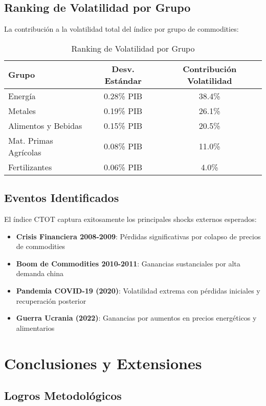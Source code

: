 \documentclass[12pt,a4paper]{article}
\begin{document}
\subsection{Ranking de Volatilidad por Grupo}

La contribución a la volatilidad total del índice por grupo de commodities:

\begin{table}[H]
\centering
\caption{Ranking de Volatilidad por Grupo}
\begin{tabular}{lcc}
\toprule
\textbf{Grupo} & \textbf{Desv. Estándar} & \textbf{Contribución Volatilidad} \\
\midrule
Energía & 0.28\% PIB & 38.4\% \\
Metales & 0.19\% PIB & 26.1\% \\
Alimentos y Bebidas & 0.15\% PIB & 20.5\% \\
Mat. Primas Agrícolas & 0.08\% PIB & 11.0\% \\
Fertilizantes & 0.06\% PIB & 4.0\% \\
\bottomrule
\end{tabular}
\label{tab:volatility_ranking}
\end{table}

\subsection{Eventos Identificados}

El índice CTOT captura exitosamente los principales shocks externos esperados:

\begin{itemize}
    \item \textbf{Crisis Financiera 2008-2009}: Pérdidas significativas por colapso de precios de commodities
    \item \textbf{Boom de Commodities 2010-2011}: Ganancias sustanciales por alta demanda china
    \item \textbf{Pandemia COVID-19 (2020)}: Volatilidad extrema con pérdidas iniciales y recuperación posterior
    \item \textbf{Guerra Ucrania (2022)}: Ganancias por aumentos en precios energéticos y alimentarios
\end{itemize}

\section{Conclusiones y Extensiones}

\subsection{Logros Metodológicos}
\end{document}
